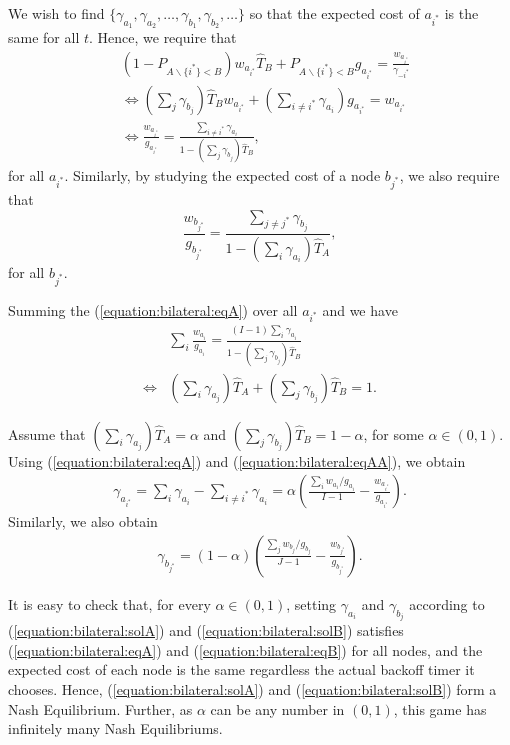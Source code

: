 \documentclass[11pt, conference]{IEEEtran}
\begin{document}
We wish to find $\{\gamma_{a_1}, \gamma_{a_2},\dots, \gamma_{b_1},\gamma_{b_2},\dots\}$ so that the expected cost of $a_{i^*}$ is the same for all $t$. Hence, we require that
\begin{align}
&(1-P_{A\backslash\{i^*\}<B})w_{a_{i^*}}\hat{T}_B+P_{A\backslash\{i^*\}<B}g_{a_{i^*}}=\frac{w_{a_{i^*}}}{\gamma_{-i^*}}\\
&\Leftrightarrow (\sum_{j}\gamma_{b_j})\hat{T}_{B}w_{a_{i^*}}+(\sum_{i\neq i^*}\gamma_{a_i})g_{a_{i^*}}=w_{a_{i^*}}\\
&\Leftrightarrow \frac{w_{a_{i^*}}}{g_{a_{i^*}}}=\frac{\sum_{i\neq i^*}\gamma_{a_i}}{1-(\sum_{j}\gamma_{b_j})\hat{T}_B},	\label{equation:bilateral:eqA}
\end{align}
for all $a_{i^*}$. Similarly, by studying the expected cost of a node $b_{j^*}$, we also require that
\begin{equation}
\frac{w_{b_{j^*}}}{g_{b_{j^*}}}=\frac{\sum_{j\neq j^*}\gamma_{b_j}}{1-(\sum_{i}\gamma_{a_i})\hat{T}_A}, \label{equation:bilateral:eqB}
\end{equation}
for all $b_{j^*}$.

Summing the (\ref{equation:bilateral:eqA}) over all $a_{i^*}$ and we have
\begin{align}
&\sum_{i}\frac{w_{a_{i}}}{g_{a_{i}}}=\frac{(I-1)\sum_{i}\gamma_{a_i}}{1-(\sum_{j}\gamma_{b_j})\hat{T}_B}	 \label{equation:bilateral:eqAA}\\
\Leftrightarrow &(\sum_{i}\gamma_{a_j})\hat{T}_A+(\sum_{j}\gamma_{b_j})\hat{T}_B=1.	 \label{equation:bilateral:sum}
\end{align}

Assume that $(\sum_{i}\gamma_{a_j})\hat{T}_A=\alpha$ and $(\sum_{j}\gamma_{b_j})\hat{T}_B=1-\alpha$, for some $\alpha\in(0,1)$. Using (\ref{equation:bilateral:eqA}) and (\ref{equation:bilateral:eqAA}), we obtain
\begin{align}
\gamma_{a_{i^*}}=\sum_{i}\gamma_{a_i}-\sum_{i\neq i^*}\gamma_{a_i}=\alpha(\frac{\sum_iw_{a_i}/g_{a_i}}{I-1}-\frac{w_{a_{i^*}}}{g_{a_{i^*}}}).	 \label{equation:bilateral:solA}
\end{align}
Similarly, we also obtain
\begin{align}
\gamma_{b_{j^*}}=(1-\alpha)(\frac{\sum_jw_{b_j}/g_{b_j}}{J-1}-\frac{w_{b_{j^*}}}{g_{b_{j^*}}}). \label{equation:bilateral:solB}
\end{align}

It is easy to check that, for every $\alpha\in(0,1)$, setting $\gamma_{a_i}$ and $\gamma_{b_j}$ according to (\ref{equation:bilateral:solA}) and (\ref{equation:bilateral:solB}) satisfies (\ref{equation:bilateral:eqA}) and (\ref{equation:bilateral:eqB}) for all nodes, and the expected cost of each node is the same regardless the actual backoff timer it chooses. Hence, (\ref{equation:bilateral:solA}) and (\ref{equation:bilateral:solB}) form a Nash Equilibrium. Further, as $\alpha$ can be any number in $(0,1)$, this game has infinitely many Nash Equilibriums.
\end{document}

